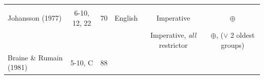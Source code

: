 \documentclass[oneside]{report}
\theoremstyle{definition}
\theoremstyle{definition}
\theoremstyle{definition}
\theoremstyle{remark}
\begin{document}
\begin{longtable}[]{@{}lcclcc@{}}
\begin{minipage}[t]{0.12\columnwidth}
\strut
\end{minipage}\tabularnewline
\begin{minipage}[t]{0.17\columnwidth}\raggedright\strut
Johansson (1977)\strut
\end{minipage} & \begin{minipage}[t]{0.09\columnwidth}\centering\strut
6-10, 12, 22\strut
\end{minipage} & \begin{minipage}[t]{0.09\columnwidth}\centering\strut
70\strut
\end{minipage} & \begin{minipage}[t]{0.06\columnwidth}\raggedright\strut
English\strut
\end{minipage} & \begin{minipage}[t]{0.31\columnwidth}\centering\strut
Imperative\strut
\end{minipage} & \begin{minipage}[t]{0.12\columnwidth}\centering\strut
\(\oplus\)\strut
\end{minipage}\tabularnewline
\begin{minipage}[t]{0.17\columnwidth}\raggedright\strut
\strut
\end{minipage} & \begin{minipage}[t]{0.09\columnwidth}\centering\strut
\strut
\end{minipage} & \begin{minipage}[t]{0.09\columnwidth}\centering\strut
\strut
\end{minipage} & \begin{minipage}[t]{0.06\columnwidth}\raggedright\strut
\strut
\end{minipage} & \begin{minipage}[t]{0.31\columnwidth}\centering\strut
Imperative, \emph{all} restrictor\strut
\end{minipage} & \begin{minipage}[t]{0.12\columnwidth}\centering\strut
\(\oplus\), (\(\lor\) 2 oldest groups)\strut
\end{minipage}\tabularnewline
\begin{minipage}[t]{0.17\columnwidth}\raggedright\strut
Braine \& Rumain (1981)\strut
\end{minipage} & \begin{minipage}[t]{0.09\columnwidth}\centering\strut
5-10, C\strut
\end{minipage} & \begin{minipage}[t]{0.09\columnwidth}\centering\strut
88\strut
\end{minipage} & \begin{minipage}[t]{0.06\columnwidth}\raggedright\strut

\end{minipage}
\end{longtable}
\end{document}
